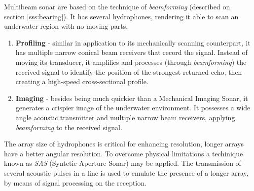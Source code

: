 Multibeam sonar are based on the technique of \textit{beamforming} (described
on section \ref{sss:bearing}). It has several hydrophones, rendering it able to
scan an underwater region with no moving parts.

\begin{enumerate}
  \item \textbf{Profiling} - similar in application to its mechanically scanning
  counterpart, it has multiple narrow conical beam receivers that record the
  signal. Instead of moving its transducer, it amplifies and processes (through
  \textit{beamforming}) the received signal to identify the position of the
  strongest returned echo, then creating a high-speed cross-sectional profile.
  \item \textbf{Imaging} - besides being much quickier than a Mechanical Imaging
  Sonar, it generates a crispier image of the underwater environment. It
  possesses a wide angle acoustic transmitter and multiple narrow beam
  receivers, applying \textit{beamforming} to the received signal.
\end{enumerate}

The array size of hydrophones is critical for enhancing resolution, longer
arrays have a better angular resolution. To overcome physical limitations a
techinique known as \textit{SAS} (Syntetic Aperture Sonar) may be applied. The
transmission of several acoustic pulses in a line is used to emulate the
presence of a longer array, by means of signal processing on the reception.
